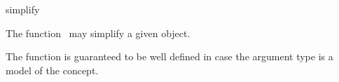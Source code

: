 \begin{ccRefFunction}{simplify}

\ccDefinition

The function \ccRefName\ may simplify a given object. 

The function is guaranteed to be well defined in case the argument type 
is a model of the  concept. 


{}


\ccSeeAlso

\\
\\

\end{ccRefFunction}
